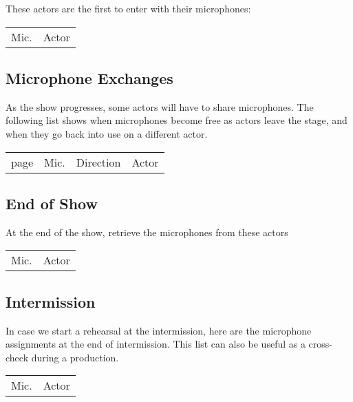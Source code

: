 \documentclass[letterpaper]{article}
\begin{document}
These actors are the first to enter with their microphones:

\begin{center}
\begin{longtable}{|l|l|}
\hline Mic. & Actor \endhead \hline

\end{longtable}
\end{center}

\subsection {Microphone Exchanges}

As the show progresses, some actors will have to share microphones. The
following list shows when microphones become free as actors leave the
stage, and when they go back into use on a different actor.

\begin{center}
\begin{longtable}{|l|l|l|l|}
\hline page & Mic. & Direction & Actor \endhead \hline

\end{longtable}
\end{center}

\subsection {End of Show}

At the end of the show, retrieve the microphones from these actors

\begin{center}
\begin{longtable}{|l|l|}
\hline Mic. & Actor \endhead \hline

\end{longtable}
\end{center}

\subsection {Intermission}

In case we start a rehearsal at the intermission, here are the microphone
assignments at the end of intermission.  This list can also be useful as a 
cross-check during a production.

\begin{center}
\begin{longtable}{|l|l|}
\hline Mic. & Actor \endhead \hline

\end{longtable}
\end{center}
\end{document}
